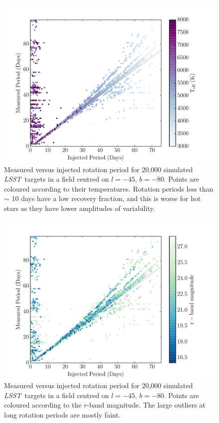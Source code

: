 \documentclass[useAMS, usenatbib, preprint, 12pt]{aastex}
\newcommand{\LSST}{{\it LSST}}
\begin{document}
\begin{figure}
\begin{center}
\includegraphics[width=6in, clip=true]{figures/pvp_T_-80.pdf}
\caption[\LSST\ rotation period recovery results with temperature dependence]
{Measured versus injected rotation period for 20,000 simulated \LSST\ targets
in a field centred on $l=-45$, $b=-80$.
Points are coloured according to their temperatures.
Rotation periods less than $\sim$ 10 days have a low recovery fraction, and
this is worse for hot stars as they have lower amplitudes of variability.}
\label{fig:derek}
\end{center}
\end{figure}

\begin{figure}
\begin{center}
\includegraphics[width=6in, clip=true]{figures/pvp_r_-80.pdf}
\caption[\LSST\ rotation period recovery results with magnitude dependence]
{Measured versus injected rotation period for 20,000 simulated \LSST\ targets
in a field centred on $l=-45$, $b=-80$.
Points are coloured according to the $r$-band magnitude.
The large outliers at long rotation periods are mostly faint.}
\label{fig:derek2}
\end{center}
\end{figure}
\end{document}
